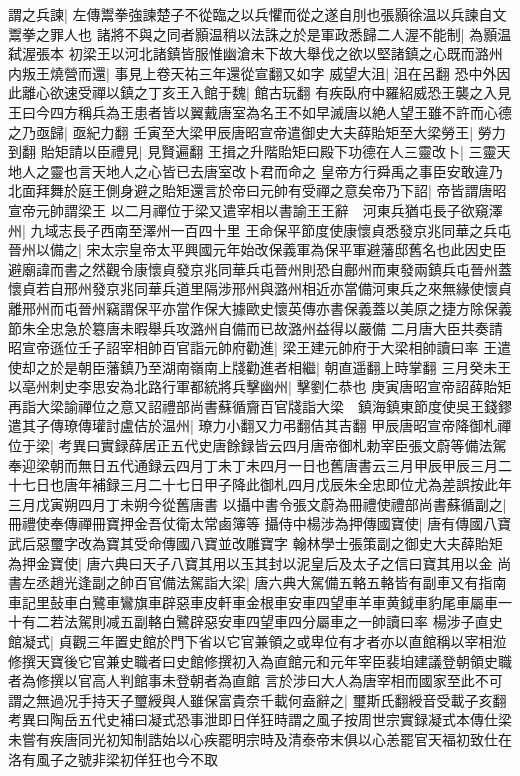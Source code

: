 謂之兵諫|{
	左傳鬻拳強諫楚子不從臨之以兵懼而從之遂自刖也張顥徐温以兵諫自文鬻拳之罪人也}
諸將不與之同者顥温稍以法誅之於是軍政悉歸二人渥不能制|{
	為顥温弑渥張本}
初梁王以河北諸鎮皆服惟幽滄未下故大舉伐之欲以堅諸鎮之心既而潞州内叛王燒營而還|{
	事見上卷天祐三年還從宣翻又如字}
威望大沮|{
	沮在呂翻}
恐中外因此離心欲速受禪以鎮之丁亥王入館于魏|{
	館古玩翻}
有疾臥府中羅紹威恐王襲之入見王曰今四方稱兵為王患者皆以翼戴唐室為名王不如早滅唐以絶人望王雖不許而心德之乃亟歸|{
	亟紀力翻}
壬寅至大梁甲辰唐昭宣帝遣御史大夫薛貽矩至大梁勞王|{
	勞力到翻}
貽矩請以臣禮見|{
	見賢遍翻}
王揖之升階貽矩曰殿下功德在人三靈改卜|{
	三靈天地人之靈也言天地人之心皆已去唐室改卜君而命之}
皇帝方行舜禹之事臣安敢違乃北面拜舞於庭王側身避之貽矩還言於帝曰元帥有受禪之意矣帝乃下詔|{
	帝皆謂唐昭宣帝元帥謂梁王}
以二月禪位于梁又遣宰相以書諭王王辭　河東兵猶屯長子欲窺澤州|{
	九域志長子西南至澤州一百四十里}
王命保平節度使康懷貞悉發京兆同華之兵屯晉州以備之|{
	宋太宗皇帝太平興國元年始改保義軍為保平軍避藩邸舊名也此因史臣避廟諱而書之然觀令康懷貞發京兆同華兵屯晉州則恐自鄜州而東發兩鎮兵屯晉州蓋懷貞若自邢州發京兆同華兵道里隔涉邢州與潞州相近亦當備河東兵之來無緣使懷貞離邢州而屯晉州竊謂保平亦當作保大據歐史懷英傳亦書保義蓋以美原之捷方除保義節朱全忠急於簒唐未暇舉兵攻潞州自備而已故潞州益得以嚴備}
二月唐大臣共奏請昭宣帝遜位壬子詔宰相帥百官詣元帥府勸進|{
	梁王建元帥府于大梁相帥讀曰率}
王遣使却之於是朝臣藩鎮乃至湖南嶺南上牋勸進者相繼|{
	朝直遥翻上時掌翻}
三月癸未王以亳州刺史李思安為北路行軍都統將兵擊幽州|{
	擊劉仁恭也}
庚寅唐昭宣帝詔薛貽矩再詣大梁諭禪位之意又詔禮部尚書蘇循齎百官牋詣大梁　鎮海鎮東節度使吳王錢鏐遣其子傳璙傳瓘討盧佶於温州|{
	璙力小翻又力弔翻佶其吉翻}
甲辰唐昭宣帝降御札禪位于梁|{
	考異曰實録薛居正五代史唐餘録皆云四月唐帝御札勅宰臣張文蔚等備法駕奉迎梁朝而無日五代通録云四月丁未丁未四月一日也舊唐書云三月甲辰甲辰三月二十七日也唐年補録三月二十七日甲子降此御札四月戊辰朱全忠即位尤為差誤按此年三月戊寅朔四月丁未朔今從舊唐書}
以攝中書令張文蔚為冊禮使禮部尚書蘇循副之|{
	冊禮使奉傳禪冊寶押金吾仗衛太常鹵簿等}
攝侍中楊涉為押傳國寶使|{
	唐有傳國八寶武后惡璽字改為寶其受命傳國八寶並改雕寶字}
翰林學士張策副之御史大夫薛貽矩為押金寶使|{
	唐六典曰天子八寶其用以玉其封以泥皇后及太子之信曰寶其用以金}
尚書左丞趙光逢副之帥百官備法駕詣大梁|{
	唐六典大駕備五輅五輅皆有副車又有指南車記里鼔車白鷺車鸞旗車辟惡車皮軒車金根車安車四望車羊車黄鉞車豹尾車屬車一十有二若法駕則减五副輅白鷺辟惡安車四望車四分屬車之一帥讀曰率}
楊涉子直史館凝式|{
	貞觀三年置史館於門下省以它官兼領之或卑位有才者亦以直館稱以宰相涖修撰天寶後它官兼史職者曰史館修撰初入為直館元和元年宰臣裴垍建議登朝領史職者為修撰以官高人判館事未登朝者為直館}
言於涉曰大人為唐宰相而國家至此不可謂之無過况手持天子璽綬與人雖保富貴奈千載何盍辭之|{
	璽斯氏翻綬音受載子亥翻　考異曰陶岳五代史補曰凝式恐事泄即日佯狂時謂之風子按周世宗實録凝式本傳仕梁未嘗有疾唐同光初知制誥始以心疾罷明宗時及清泰帝末俱以心恙罷官天福初致仕在洛有風子之號非梁初佯狂也今不取}
